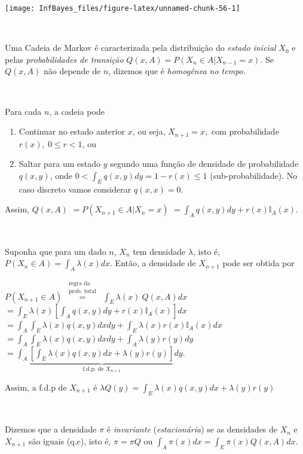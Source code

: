 \documentclass[
]{book}
\begin{document}
\begin{center}\texttt{[image: InfBayes\_files/figure-latex/unnamed-chunk-56-1]} \end{center}

\(~\)

Uma Cadeia de Markov é caracterizada pela distribuição do \emph{estado inicial} \(X_0\) e pelas \emph{probabilidades de transição} \(Q(x,A)=P(X_n\in A|X_{n-1}=x)\). Se \(Q(x,A)\) não depende de \(n\), dizemos que é \emph{homogênea no tempo}.

\(~\)

Para cada \(n\), a cadeia pode

\begin{enumerate}
\def\labelenumi{\arabic{enumi}.}
\item
  Continuar no estado anterior \(x\), ou seja, \(X_{n+1}=x,\) com probabilidade \(r(x),~ 0\leq r<1\), ou
\item
  Saltar para um estado \(y\) segundo uma função de densidade de probabilidade \(q(x,y)\), onde \(0<\displaystyle\int_E q(x,y)dy=1-r(x)\leq 1\) (sub-probabilidade). No caso discreto vamos considerar \(q(x,x)=0\).
\end{enumerate}

Assim, \(Q(x,A)\) \(=P(X_{n+1}\in A|X_{n}=x)\) \(=\displaystyle\int_A q(x,y)dy+r(x)\mathbb{I}_A(x)\).

\(~\)

Suponha que para um dado \(n\), \(X_n\) tem densidade \(\lambda\), isto é, \(P(X_n\in A)=\displaystyle\int_A\lambda(x)dx\). Então, a densidade de \(X_{n+1}\) pode ser obtida por

\(P(X_{n+1}\in A)~\overset{\begin{array}{c} \text{regra da }\\ \text{prob. total}\end{array}}{=}~ \displaystyle\int_E \lambda(x)~Q(x,A)dx\) \(=\displaystyle\int_E\lambda(x)\left[\int_A q(x,y)dy+r(x)\mathbb{I}_A(x)\right]dx\) \(=\displaystyle\int_A\int_E\lambda(x)q(x,y)dxdy+\int_E\lambda(x)r(x)\mathbb{I}_A(x)dx\) \(=\displaystyle\int_A\int_E\lambda(x)q(x,y)dxdy+\int_A\lambda(y)r(y)dy\)
\(=\displaystyle \int_A\underbrace{\left[\int_E\lambda(x)q(x,y)dx+\lambda(y)r(y)\right]}_{\text{f.d.p. de }X_{n+1}}dy\).

Assim, a f.d.p de \(X_{n+1}\) é \(\lambda Q(y)= \displaystyle\int_E\lambda(x)q(x,y)dx+\lambda(y)r(y)\)

\(~\)

Dizemos que a densidade \(\pi\) é \emph{invariante} (\emph{estacionária}) se as densidades de \(X_{n}\) e \(X_{n+1}\) são iguais (q.c), isto é, \(\pi=\pi Q\) ou \(\int_A \pi(x)dx=\int_E \pi(x)Q(x,A)dx\).
\end{document}

